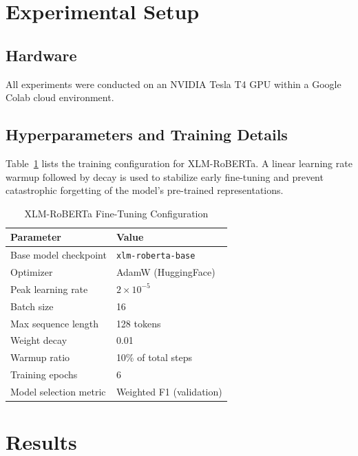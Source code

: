 \documentclass[conference]{IEEEtran}
\begin{document}
\section{Experimental Setup}

\subsection{Hardware}
All experiments were conducted on an NVIDIA Tesla T4 GPU within a Google Colab cloud environment.

\subsection{Hyperparameters and Training Details}
Table~\ref{tab:hyper} lists the training configuration for XLM-RoBERTa. A linear learning rate warmup followed by decay is used to stabilize early fine-tuning and prevent catastrophic forgetting of the model's pre-trained representations.

\begin{table}[h]
\centering
\caption{XLM-RoBERTa Fine-Tuning Configuration}
\label{tab:hyper}
\begin{tabular}{ll}
\toprule
\textbf{Parameter} & \textbf{Value} \\
\midrule
Base model checkpoint   & \texttt{xlm-roberta-base} \\
Optimizer               & AdamW (HuggingFace) \\
Peak learning rate      & $2 \times 10^{-5}$ \\
Batch size              & 16 \\
Max sequence length     & 128 tokens \\
Weight decay            & 0.01 \\
Warmup ratio            & 10\% of total steps \\
Training epochs         & 6 \\
Model selection metric  & Weighted F1 (validation) \\
\bottomrule
\end{tabular}
\end{table}

\section{Results}
\end{document}
